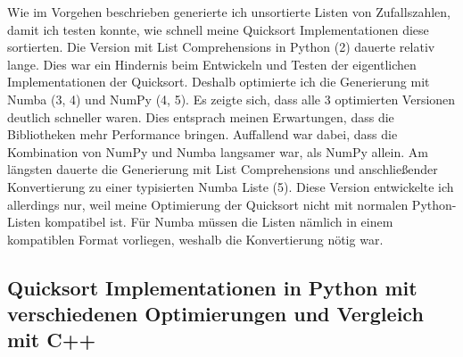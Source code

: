 \documentclass[11pt,a4paper]{article}
\begin{document}
Wie im Vorgehen beschrieben generierte ich unsortierte Listen von Zufallszahlen,
damit ich testen konnte, wie schnell meine Quicksort Implementationen diese
sortierten. Die Version mit List Comprehensions in Python (2) dauerte relativ lange.
Dies war ein Hindernis beim Entwickeln und Testen der eigentlichen Implementationen der
Quicksort. Deshalb optimierte ich die Generierung mit Numba (3, 4) und NumPy (4, 5).
Es zeigte sich, dass alle 3 optimierten Versionen deutlich schneller waren.
Dies entsprach meinen Erwartungen, dass die Bibliotheken mehr Performance bringen.
Auffallend war dabei, dass die Kombination von NumPy und Numba langsamer war,
als NumPy allein.
Am längsten dauerte die Generierung mit List Comprehensions und anschließender
Konvertierung zu einer typisierten Numba Liste (5). Diese Version entwickelte
ich allerdings nur, weil meine Optimierung der Quicksort nicht mit normalen Python-Listen
kompatibel ist. Für Numba müssen die Listen nämlich in einem kompatiblen Format vorliegen,
weshalb die Konvertierung nötig war.

\subsection{Quicksort Implementationen in Python mit verschiedenen Optimierungen und Vergleich mit C++}

\begin{bchart}[min=0, max=80, scale=1.9]
    \smallskip
    \smallskip
    \smallskip
    \smallskip
    \smallskip
    \smallskip
    \smallskip
    \smallskip
    \smallskip
    \smallskip
    \smallskip
    \smallskip
\end{bchart}
\end{document}
